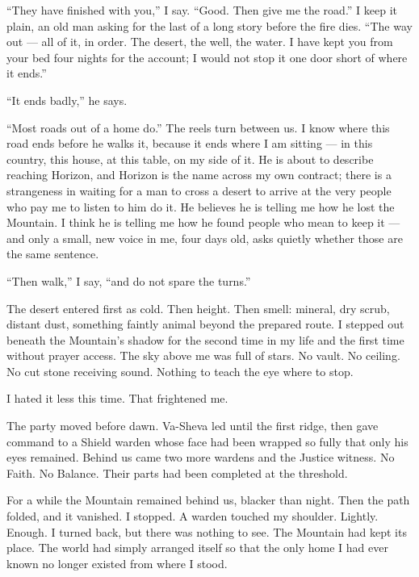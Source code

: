 ``They have finished with you,'' I say. ``Good. Then give me the road.'' I keep it plain, an old man asking for the last of a long story before the fire dies. ``The way out --- all of it, in order. The desert, the well, the water. I have kept you from your bed four nights for the account; I would not stop it one door short of where it ends.''\par

``It ends badly,'' he says.\par

``Most roads out of a home do.'' The reels turn between us. I know where this road ends before he walks it, because it ends where I am sitting --- in this country, this house, at this table, on my side of it. He is about to describe reaching Horizon, and Horizon is the name across my own contract; there is a strangeness in waiting for a man to cross a desert to arrive at the very people who pay me to listen to him do it. He believes he is telling me how he lost the Mountain. I think he is telling me how he found people who mean to keep it --- and only a small, new voice in me, four days old, asks quietly whether those are the same sentence.\par

``Then walk,'' I say, ``and do not spare the turns.''\par

\ornament

The desert entered first as cold. Then height. Then smell: mineral, dry scrub, distant dust, something faintly animal beyond the prepared route. I stepped out beneath the Mountain's shadow for the second time in my life and the first time without prayer access. The sky above me was full of stars. No vault. No ceiling. No cut stone receiving sound. Nothing to teach the eye where to stop.\par

I hated it less this time. That frightened me.\par

The party moved before dawn. Va-Sheva led until the first ridge, then gave command to a Shield warden whose face had been wrapped so fully that only his eyes remained. Behind us came two more wardens and the Justice witness. No Faith. No Balance. Their parts had been completed at the threshold.\par

For a while the Mountain remained behind us, blacker than night. Then the path folded, and it vanished. I stopped. A warden touched my shoulder. Lightly. Enough. I turned back, but there was nothing to see. The Mountain had kept its place. The world had simply arranged itself so that the only home I had ever known no longer existed from where I stood.\par

